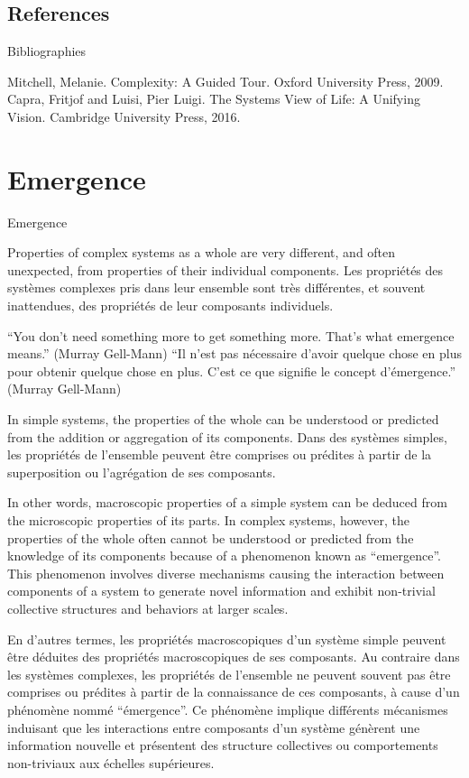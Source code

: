 \documentclass[12pt]{article}
\begin{document}
\subsection*{References}{Bibliographies}

Mitchell, Melanie. Complexity: A Guided Tour. Oxford University Press, 2009.
Capra, Fritjof and Luisi, Pier Luigi. The Systems View of Life: A Unifying Vision. Cambridge University Press, 2016.


\section{Emergence}{Emergence}


Properties of complex systems as a whole are very different, and often unexpected, from properties of their individual components.
Les propriétés des systèmes complexes pris dans leur ensemble sont très différentes, et souvent inattendues, des propriétés de leur composants individuels.



``You don’t need something more to get something more. That’s what emergence means.'' (Murray Gell-Mann)
``Il n'est pas nécessaire d'avoir quelque chose en plus pour obtenir quelque chose en plus. C'est ce que signifie le concept d'émergence.'' (Murray Gell-Mann)


In simple systems, the properties of the whole can be understood or predicted from the addition or aggregation of its components.
Dans des systèmes simples, les propriétés de l'ensemble peuvent être comprises ou prédites à partir de la superposition ou l'agrégation de ses composants.


In other words, macroscopic properties of a simple system can be deduced from the microscopic properties of its parts. In complex systems, however, the properties of the whole often cannot be understood or predicted from the knowledge of its components because of a phenomenon known as ``emergence''. This phenomenon involves diverse mechanisms causing the interaction between components of a system to generate novel information and exhibit non-trivial collective structures and behaviors at larger scales.

En d'autres termes, les propriétés macroscopiques d'un système simple peuvent être déduites des propriétés macroscopiques de ses composants. Au contraire dans les systèmes complexes, les propriétés de l'ensemble ne peuvent souvent pas être comprises ou prédites à partir de la connaissance de ces composants, à cause d'un phénomène nommé ``émergence''. Ce phénomène implique différents mécanismes induisant que les interactions entre composants d'un système génèrent une information nouvelle et présentent des structure collectives ou comportements non-triviaux aux échelles supérieures. 
\end{document}
